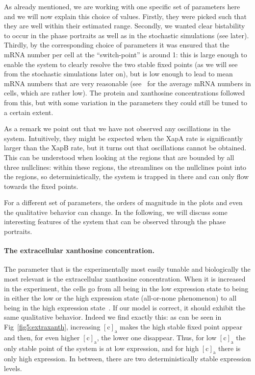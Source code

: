 \documentclass[10pt,letterpaper]{article}
\newcommand{\n}[1]{\mathrm{#1}}
\begin{document}
As already mentioned, we are working with one specific set of parameters
here and we will now explain this choice of values. Firstly, they were
picked such that they are well within their estimated range. Secondly, we
wanted clear bistability to occur in the phase portraits as well as in the
stochastic simulations (see later). Thirdly, by the corresponding choice of
parameters it was ensured that the mRNA number per cell at the
``switch-point'' is around 1: this is large enough to enable the system to
clearly resolve the two stable fixed points (as we will see from the
stochastic simulations later on), but is low enough to lead to mean mRNA
numbers that are very reasonable (see~\cite{Milo2016} for the average mRNA
numbers in cells, which are rather low). The protein and xanthosine
concentrations followed from this, but with some variation in the parameters
they could still be tuned to a certain extent.

As a remark we point out that we have not observed any oscillations in the
system. Intuitively, they might be expected when the XapA rate is
significantly larger than the XapB rate, but it turns out that oscillations
cannot be obtained. This can be understood when looking at the regions that
are bounded by all three nullclines: within these regions, the streamlines
on the nullclines point into the regions, so deterministically, the system
is trapped in there and can only flow towards the fixed points.

For a different set of parameters, the orders of magnitude in the plots and
even the qualitative behavior can change. In the following, we will discuss
some interesting features of the system that can be observed through the
phase portraits. 

\paragraph*{The extracellular xanthosine concentration.}
The parameter that is the experimentally most easily tunable and
biologically the most relevant is the extracellular xanthosine
concentration. When it is increased in the experiment, the cells go from all
being in the low expression state to being in either the low or the high
expression state (all-or-none phenomenon) to all being in the high
expression state~\cite{Chure2019}. If our model is correct, it should
exhibit the same qualitative behavior. Indeed we find exactly this: as can
be seen in Fig~\ref{fig5:extraxanth}, increasing $\n{[c]_a}$ makes the high
stable fixed point appear and then, for even higher $\n{[c]_a}$, the lower
one disappear. Thus, for low $\n{[c]_a}$ the only stable point of the system
is at low expression, and for high $\n{[c]_a}$ there is only high
expression. In between, there are two deterministically stable expression
levels.
\end{document}
